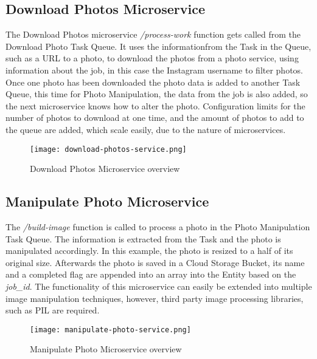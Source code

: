 \documentclass[conference]{IEEEtran}
\begin{document}
\subsection{Download Photos Microservice}

The Download Photos microservice \emph{/process-work} function gets called from the Download Photo Task Queue. It uses the informationfrom the Task in the Queue, such as a URL to a photo, to download the photos from a photo service, using information about the job, in this case the Instagram username to filter photos. Once one photo has been downloaded the photo data is added to another Task Queue, this time for Photo Manipulation, the data from the job is also added, so the next microservice knows how to alter the photo. Configuration limits for the number of photos to download at one time, and the amount of photos to add to the queue are added, which scale easily, due to the nature of microservices.


\begin{figure}[ht]
    \centering
    \texttt{[image: download-photos-service.png]}
    \caption{Download Photos Microservice overview}
    \label{fig:dps}
\end{figure}


\subsection{Manipulate Photo Microservice}

The \emph{/build-image} function is called to process a photo in the Photo Manipulation Task Queue. The information is extracted from the Task and the photo is manipulated accordingly. In this example, the photo is resized to a half of its original size. Afterwards the photo is saved in a Cloud Storage Bucket, its name and a completed flag are appended into an array into the Entity based on the \emph{job\_id}.\newline
\newline\newline
The functionality of this microservice can easily be extended into multiple image manipulation techniques, however, third party image processing libraries, such as PIL \cite{pil} are required.


\begin{figure}[ht] %
    \centering
    \texttt{[image: manipulate-photo-service.png]}
    \caption{Manipulate Photo Microservice overview}
    \label{fig:mso}
\end{figure}
\end{document}

